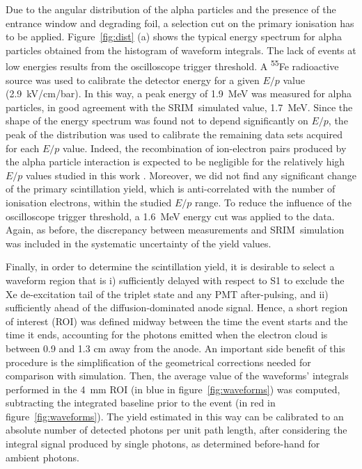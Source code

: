 \documentclass[%
 reprint,
superscriptaddress,
 amsmath,amssymb,
 aps,
]{revtex4-2}
\begin{document}
Due to the angular distribution of the alpha particles and the presence of the entrance window and degrading foil, a selection cut on the primary ionisation has to be applied. Figure~\ref{fig:dist} (a) shows the typical energy spectrum for alpha particles obtained from the histogram of waveform integrals. The lack of events at low energies results from the oscilloscope trigger threshold. A \textsuperscript{55}Fe radioactive source was used to calibrate the detector energy for a given $E/p$ value (2.9~kV/cm/bar). In this way, a peak energy of 1.9~MeV was measured for alpha particles, in good agreement with the SRIM~simulated value, 1.7~MeV. Since the shape of the energy spectrum was found not to depend significantly on $E/p$, the peak of the distribution was used to calibrate the remaining data sets acquired for each $E/p$ value. Indeed, the recombination of ion-electron pairs produced by the alpha particle interaction is expected to be negligible for the relatively high $E/p$ values studied in this work \cite{recombination}. Moreover, we did not find any significant change of the primary scintillation yield, which is anti-correlated with the number of ionisation electrons, within the studied $E/p$ range. To reduce the influence of the oscilloscope trigger threshold, a 1.6~MeV energy cut was applied to the data. Again, as before, the discrepancy between measurements and SRIM~simulation was included in the systematic uncertainty of the yield values.

Finally, in order to determine the scintillation yield, it is desirable to select a waveform region that is i) sufficiently delayed with respect to S1 to exclude the Xe de-excitation tail of the triplet state and any PMT after-pulsing, and ii) sufficiently ahead of the diffusion-dominated anode signal. Hence, a short region of interest (ROI) was defined midway between the time the event starts and the time it ends, accounting for the photons emitted when the electron cloud is between 0.9 and 1.3 cm away from the anode. An important side benefit of this procedure is the simplification of the geometrical corrections needed for comparison with simulation.
Then, the average value of the waveforms' integrals performed in the 4~mm ROI (in blue in figure~\ref{fig:waveforms}) was computed, subtracting the integrated baseline prior to the event (in red in figure~\ref{fig:waveforms}). The yield estimated in this way can be calibrated to an absolute number of detected photons per unit path length, after considering the integral signal produced by single photons, as determined before-hand for ambient photons.
\end{document}

